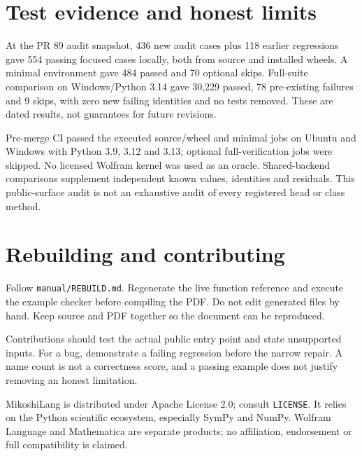 \documentclass[11pt,a4paper]{article}
\begin{document}
\section{Test evidence and honest limits}
At the PR 89 audit snapshot, 436 new audit cases plus 118 earlier regressions gave 554 passing focused cases locally, both from source and installed wheels. A minimal environment gave 484 passed and 70 optional skips. Full-suite comparison on Windows/Python 3.14 gave 30,229 passed, 78 pre-existing failures and 9 skips, with zero new failing identities and no tests removed. These are dated results, not guarantees for future revisions.

Pre-merge CI passed the executed source/wheel and minimal jobs on Ubuntu and Windows with Python 3.9, 3.12 and 3.13; optional full-verification jobs were skipped. No licensed Wolfram kernel was used as an oracle. Shared-backend comparisons supplement independent known values, identities and residuals. This public-surface audit is not an exhaustive audit of every registered head or class method.

\clearpage
\clearpage
\clearpage
\section{Rebuilding and contributing}
Follow \texttt{manual/REBUILD.md}. Regenerate the live function reference and execute the example checker before compiling the PDF. Do not edit generated files by hand. Keep source and PDF together so the document can be reproduced.

Contributions should test the actual public entry point and state unsupported inputs. For a bug, demonstrate a failing regression before the narrow repair. A name count is not a correctness score, and a passing example does not justify removing an honest limitation.

MikoshiLang is distributed under Apache License 2.0; consult \texttt{LICENSE}. It relies on the Python scientific ecosystem, especially SymPy and NumPy. Wolfram Language and Mathematica are separate products; no affiliation, endorsement or full compatibility is claimed.
\end{document}
